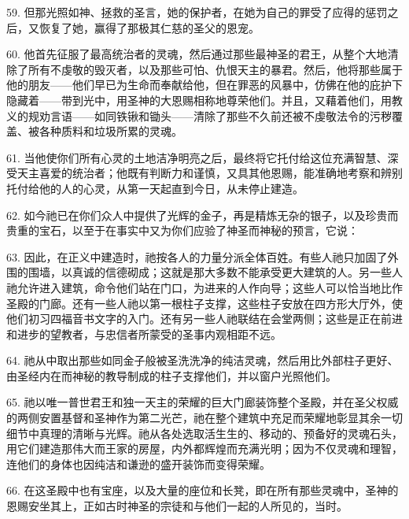 59. 但那光照如神、拯救的圣言，她的保护者，在她为自己的罪受了应得的惩罚之后，又恢复了她，赢得了那极其仁慈的圣父的恩宠。\par

60. 他首先征服了最高统治者的灵魂，然后通过那些最神圣的君王，从整个大地清除了所有不虔敬的毁灭者，以及那些可怕、仇恨天主的暴君。然后，他将那些属于他的朋友——他们早已为生命而奉献给他，但在罪恶的风暴中，仿佛在他的庇护下隐藏着——带到光中，用圣神的大恩赐相称地尊荣他们。并且，又藉着他们，用教义的规劝言语——如同铁锹和锄头——清除了那些不久前还被不虔敬法令的污秽覆盖、被各种质料和垃圾所累的灵魂。\par

61. 当他使你们所有心灵的土地洁净明亮之后，最终将它托付给这位充满智慧、深受天主喜爱的统治者；他既有判断力和谨慎，又具其他恩赐，能准确地考察和辨别托付给他的人的心灵，从第一天起直到今日，从未停止建造。\par

62. 如今祂已在你们众人中提供了光辉的金子，再是精炼无杂的银子，以及珍贵而贵重的宝石，以至于在事实中又为你们应验了神圣而神秘的预言，它说：\par

63. 因此，在正义中建造时，祂按各人的力量分派全体百姓。有些人祂只加固了外围的围墙，以真诚的信德砌成；这就是那大多数不能承受更大建筑的人。另一些人祂允许进入建筑，命令他们站在门口，为进来的人作向导；这些人可以恰当地比作圣殿的门廊。还有一些人祂以第一根柱子支撑，这些柱子安放在四方形大厅外，使他们初习四福音书文字的入门。还有另一些人祂联结在会堂两侧；这些是正在前进和进步的望教者，与忠信者所蒙受的圣事内观相距不远。\par

64. 祂从中取出那些如同金子般被圣洗洗净的纯洁灵魂，然后用比外部柱子更好、由圣经内在而神秘的教导制成的柱子支撑他们，并以窗户光照他们。\par

65. 祂以唯一普世君王和独一天主的荣耀的巨大门廊装饰整个圣殿，并在圣父权威的两侧安置基督和圣神作为第二光芒，祂在整个建筑中充足而荣耀地彰显其余一切细节中真理的清晰与光辉。祂从各处选取活生生的、移动的、预备好的灵魂石头，用它们建造那伟大而王家的房屋，内外都辉煌而充满光明；因为不仅灵魂和理智，连他们的身体也因纯洁和谦逊的盛开装饰而变得荣耀。\par

66. 在这圣殿中也有宝座，以及大量的座位和长凳，即在所有那些灵魂中，圣神的恩赐安坐其上，正如古时神圣的宗徒和与他们一起的人所见的，当时。\par

